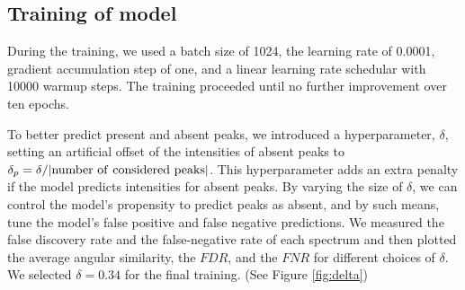 \documentclass[10pt,a4paper]{article}
\begin{document}
\subsection*{Training of model}

During the training, we used a batch size of 1024, the learning rate of 0.0001, gradient accumulation step of one, and a linear learning rate schedular with 10000 warmup steps. The training proceeded until no further improvement over ten epochs.

To better predict present and absent peaks, we introduced a hyperparameter, $\delta$, setting an artificial offset of the intensities of absent peaks to $\delta_p =\delta / |\rm{number\ of\ considered\ peaks}|$. This hyperparameter adds an extra penalty if the model predicts intensities for absent peaks. By varying the size of $\delta$, we can control the model’s propensity to predict peaks as absent, and by such means, tune the model’s false positive and false negative predictions. We measured the false discovery rate and the false-negative rate of each spectrum and then plotted the average angular similarity, the $\mathit{FDR}$, and the $\mathit{FNR}$ for different choices of $\delta$. We selected $\delta=0.34$ for the final training. (See Figure \ref{fig:delta})
\end{document}

